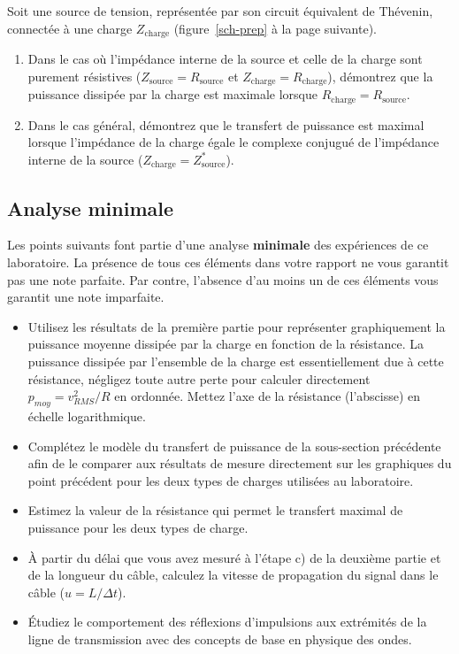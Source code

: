 \documentclass[canadien,12pt,oneside,letterpaper]{article}
\begin{document}
\noindent Soit une source de tension, représentée par son circuit équivalent de Thévenin, connectée à une charge $Z_{\mathrm{charge}}$ (figure~\ref{sch-prep} à la page suivante).
\begin{enumerate}%
    \item Dans le cas où l'impédance interne de la source et celle de la charge sont purement résistives ($Z_{\mathrm{source}}=R_{\mathrm{source}}$ et $Z_{\mathrm{charge}}=R_{\mathrm{charge}}$), démontrez que la puissance dissipée par la charge est maximale lorsque $R_{\mathrm{charge}}=R_{\mathrm{source}}$.
    \item Dans le cas général, démontrez que le transfert de puissance est maximal lorsque l'impédance de la charge égale le complexe conjugué de l'impédance interne de la source ($Z_{\mathrm{charge}}=Z^*_{\mathrm{source}}$).
\end{enumerate}

\subsection{Analyse minimale}

Les points suivants font partie d'une analyse \textbf{minimale} des expériences de ce laboratoire. La présence de tous ces éléments dans votre rapport ne vous garantit pas une note parfaite. Par contre, l'absence d'au moins un de ces éléments vous garantit une note imparfaite.

\begin{itemize}
    \item Utilisez les résultats de la première partie pour représenter graphiquement la puissance moyenne dissipée par la charge en fonction de la résistance. La puissance dissipée par l'ensemble de la charge est essentiellement due à cette résistance, négligez toute autre perte pour calculer directement $p_{moy}=v_{RMS}^2/R$ en ordonnée. Mettez l'axe de la résistance (l'abscisse) en échelle logarithmique.
    \item Complétez le modèle du transfert de puissance de la sous-section précédente afin de le comparer aux résultats de mesure directement sur les graphiques du point précédent pour les deux types de charges utilisées au laboratoire.
    \item Estimez la valeur de la résistance qui permet le transfert maximal de puissance pour les deux types de charge.
    \item À partir du délai que vous avez mesuré à l'étape c) de la deuxième partie et de la longueur du câble, calculez la vitesse de propagation du signal dans le câble ($u=L/\Delta t$).
    \item Étudiez le comportement des réflexions d'impulsions aux extrémités de la ligne de transmission avec des concepts de base en physique des ondes.
\end{itemize}
\end{document}
